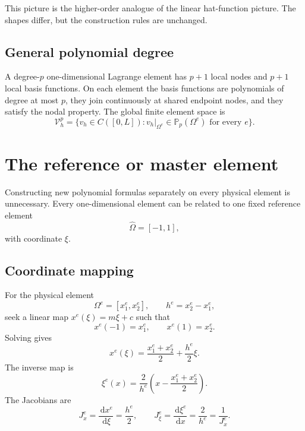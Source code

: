 \documentclass[11pt]{article}
\newcommand{\Om}{\Omega}
\newcommand{\dd}{\,\mathrm{d}}
\newcommand{\Vh}{\mathcal{V}_h}
\newcommand{\Pp}{\mathbb{P}}
\begin{document}
This picture is the higher-order analogue of the linear hat-function picture.
The shapes differ, but the construction rules are unchanged.

\subsection{General polynomial degree}

A degree-$p$ one-dimensional Lagrange element has $p+1$ local nodes and
$p+1$ local basis functions. On each element the basis functions are
polynomials of degree at most $p$, they join continuously at shared endpoint
nodes, and they satisfy the nodal property. The global finite element space is
\begin{equation}
\Vh^p
=
\{v_h\in C([0,L]):v_h|_{\Om^e}\in\Pp_p(\Om^e)
\text{ for every }e\}.
\label{eq:Vhp}
\end{equation}

\section{The reference or master element}

Constructing new polynomial formulas separately on every physical element is
unnecessary. Every one-dimensional element can be related to one fixed
reference element
\[
\widehat\Om=[-1,1],
\]
with coordinate $\xi$.

\subsection{Coordinate mapping}

For the physical element
\[
\Om^e=[x_1^e,x_2^e],
\qquad
h^e=x_2^e-x_1^e,
\]
seek a linear map $x^e(\xi)=m\xi+c$ such that
\[
x^e(-1)=x_1^e,
\qquad
x^e(1)=x_2^e.
\]
Solving gives
\begin{equation}
\boxed{
x^e(\xi)
=\frac{x_1^e+x_2^e}{2}
+\frac{h^e}{2}\xi.}
\label{eq:map}
\end{equation}
The inverse map is
\begin{equation}
\boxed{
\xi^e(x)
=\frac{2}{h^e}
\left(x-\frac{x_1^e+x_2^e}{2}\right).}
\label{eq:inverse-map}
\end{equation}
The Jacobians are
\begin{equation}
J_x^e=\frac{\dd x^e}{\dd\xi}=\frac{h^e}{2},
\qquad
J_\xi^e=\frac{\dd\xi^e}{\dd x}=\frac{2}{h^e}
=\frac{1}{J_x^e}.
\label{eq:jacobians}
\end{equation}

\begin{center}
\end{center}
\end{document}
